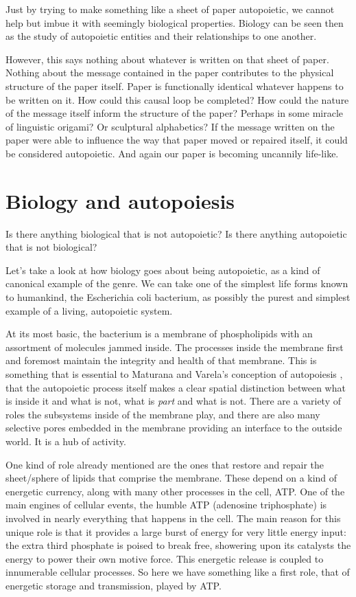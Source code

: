 \documentclass[12pt]{scrartcl}
\begin{document}
Just by trying to make something like a sheet of paper autopoietic, we cannot help but imbue it with seemingly biological properties.  Biology can be seen then as the study of autopoietic entities and their relationships to one another.  

However, this says nothing about whatever is written on that sheet of paper.  Nothing about the message contained in the paper contributes to the physical structure of the paper itself.  Paper is functionally identical whatever happens to be written on it.  How could this causal loop be completed?  How could the nature of the message itself inform the structure of the paper?  Perhaps in some miracle of linguistic origami?  Or sculptural alphabetics?  If the message written on the paper were able to influence the way that paper moved or repaired itself, it could be considered autopoietic.  And again our paper is becoming uncannily life-like.

\section{Biology and autopoiesis}

Is there anything biological that is not autopoietic?  Is there anything autopoietic that is not biological?  

Let's take a look at how biology goes about being autopoietic, as a kind of canonical example of the genre.  We can take one of the simplest life forms known to humankind, the Escherichia coli bacterium, as possibly the purest and simplest example of a living, autopoietic system.   \cite{Alon}

At its most basic, the bacterium is a membrane of phospholipids with an assortment of molecules jammed inside.  The processes inside the membrane first and foremost maintain the integrity and health of that membrane.  This is something that is essential to Maturana and Varela's conception of autopoiesis \cite{Maturana}, that the autopoietic process itself makes a clear spatial distinction between what is inside it and what is not, what is \emph{part} and what is not.  There are a variety of roles the subsystems inside of the membrane play, and there are also many selective pores embedded in the membrane providing an interface to the outside world.  It is a hub of activity.  

One kind of role already mentioned are the ones that restore and repair the sheet/sphere of lipids that comprise the membrane.  These depend on a kind of energetic currency, along with many other processes in the cell, ATP.  One of the main engines of cellular events, the humble ATP (adenosine triphosphate) is involved in nearly everything that happens in the cell.  The main reason for this unique role is that it provides a large burst of energy for very little energy input: the extra third phosphate is poised to break free, showering upon its catalysts the energy to power their own motive force.  This energetic release is coupled to innumerable cellular processes.  So here we have something like a first role, that of energetic storage and transmission, played by ATP.  
\end{document}
